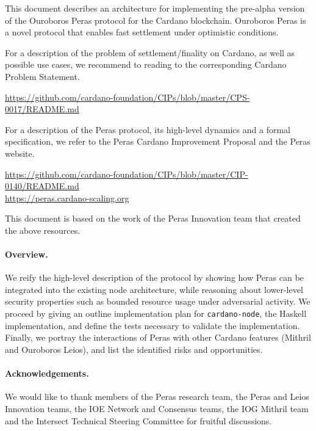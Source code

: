 This document describes an architecture for implementing the pre-alpha version of the Ouroboros Peras protocol for the Cardano blockchain.
Ouroboros Peras is a novel protocol that enables fast settlement under optimistic conditions.

For a description of the problem of settlement/finality on Cardano, as well as possible use cases, we recommend to reading to the corresponding Cardano Problem Statement.
\begin{center}
  \url{https://github.com/cardano-foundation/CIPs/blob/master/CPS-0017/README.md}
\end{center}
For a description of the Peras protocol, its high-level dynamics and a formal specification, we refer to the Peras Cardano Improvement Proposal and the Peras website.
\begin{center}
  \url{https://github.com/cardano-foundation/CIPs/blob/master/CIP-0140/README.md}\\
  \url{https://peras.cardano-scaling.org}
\end{center}
This document is based on the work of the Peras Innovation team that created the above resources.

\paragraph{Overview.}
We reify the high-level description of the protocol by showing how Peras can be integrated into the existing node architecture, while reasoning about lower-level security properties such as bounded resource usage under adversarial activity.
We proceed by giving an outline implementation plan for \texttt{cardano-node}, the Haskell implementation, and define the tests necessary to validate the implementation.
Finally, we portray the interactions of Peras with other Cardano features (Mithril and Ouroboros Leios), and list the identified risks and opportunities.

\paragraph{Acknowledgements.}
We would like to thank members of the Peras research team, the Peras and Leios Innovation teams, the IOE Network and Consensus teams, the IOG Mithril team and the Intersect Technical Steering Committee for fruitful discussions.

